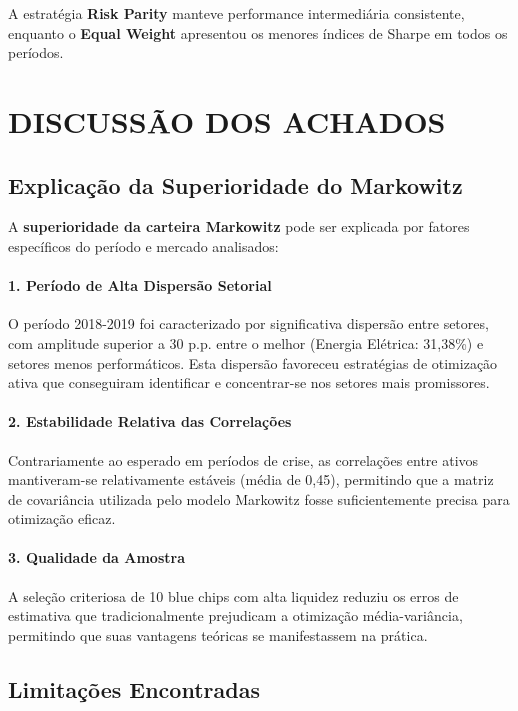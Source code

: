 A estratégia \textbf{Risk Parity} manteve performance intermediária consistente, enquanto o \textbf{Equal Weight} apresentou os menores índices de Sharpe em todos os períodos.

\section{DISCUSSÃO DOS ACHADOS}

\subsection{Explicação da Superioridade do Markowitz}

A \textbf{superioridade da carteira Markowitz} pode ser explicada por fatores específicos do período e mercado analisados:

\paragraph{1. Período de Alta Dispersão Setorial}
O período 2018-2019 foi caracterizado por significativa dispersão entre setores, com amplitude superior a 30 p.p. entre o melhor (Energia Elétrica: 31,38\%) e setores menos performáticos. Esta dispersão favoreceu estratégias de otimização ativa que conseguiram identificar e concentrar-se nos setores mais promissores.

\paragraph{2. Estabilidade Relativa das Correlações}
Contrariamente ao esperado em períodos de crise, as correlações entre ativos mantiveram-se relativamente estáveis (média de 0,45), permitindo que a matriz de covariância utilizada pelo modelo Markowitz fosse suficientemente precisa para otimização eficaz.

\paragraph{3. Qualidade da Amostra}
A seleção criteriosa de 10 blue chips com alta liquidez reduziu os erros de estimativa que tradicionalmente prejudicam a otimização média-variância, permitindo que suas vantagens teóricas se manifestassem na prática.

\subsection{Limitações Encontradas}

